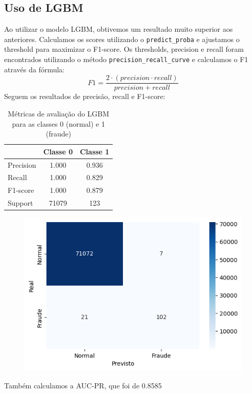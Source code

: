 \documentclass[conference]{IEEEtran}
\begin{document}
\subsection{Uso de LGBM}
\label{subsec:validacao}
Ao utilizar o modelo LGBM, obtivemos um resultado muito superior aos anteriores. Calculamos os scores utilizando o \texttt{predict\_proba} e ajustamos o threshold para maximizar o F1-score. Os thresholds, precision e recall foram encontrados utilizando o método \texttt{precision\_recall\_curve} e calculamos o F1 através da fórmula:
\begin{equation*}
    F1 = \frac{2 \cdot (precision \cdot recall)}{precision + recall}
\end{equation*}
Seguem os resultados de precisão, recall e F1-score:
\begin{table}[H]
    \caption{Métricas de avaliação do LGBM para as classes 0 (normal) e 1 (fraude)}
    \label{tab:metricas_lgbm}
    \centering
    \begin{tabular}{lcc}
        \toprule
        & \textbf{Classe 0} & \textbf{Classe 1} \\
        \midrule
        Precision  & 1.000 & 0.936 \\
        Recall     & 1.000 & 0.829 \\
        F1-score   & 1.000 & 0.879 \\
        Support    & 71079 & 123   \\
        \bottomrule
    \end{tabular}
\end{table}
  \begin{figure}[H]
    \centerline{\includegraphics[width=0.8\linewidth]{../output/matriz confusao lgbm.png}}
    \label{fig:matriz_confusao_lgbm}
  \end{figure}
Também calculamos a AUC-PR, que foi de 0.8585
\end{document}
